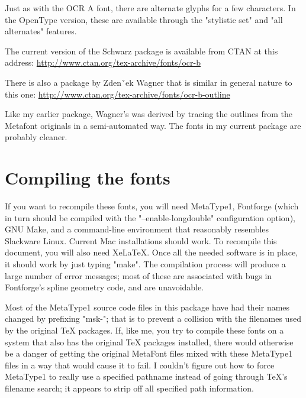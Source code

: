 \documentclass{article}
\begin{document}
Just as with the OCR A font, there are alternate glyphs for a
few characters.  In the OpenType version, these are available through the
"stylistic set" and "all alternates" features.

The current version of the Schwarz package is available from CTAN at this
address:  \url{http://www.ctan.org/tex-archive/fonts/ocr-b}

There is also a package by Zdenˇ\hspace{-0.1in}ek Wagner that is similar
in general nature to this one:
\url{http://www.ctan.org/tex-archive/fonts/ocr-b-outline}

Like my earlier package, Wagner's was derived by tracing the outlines from
the Metafont originals in a semi-automated way.  The fonts in my current
package are probably cleaner.

\section{Compiling the fonts}

If you want to recompile these fonts, you will need MetaType1, Fontforge
(which in turn should be compiled with the "--enable-longdouble"
configuration option), GNU Make, and a command-line environment that
reasonably resembles Slackware Linux.  Current Mac installations should
work.  To recompile this document, you will also need XeLaTeX\@.  Once all the
needed software is in place, it should work by just typing "make".  The
compilation process will produce a large number of error messages; most of
these are associated with bugs in Fontforge's spline geometry code, and are
unavoidable.

Most of the MetaType1 source code files in this package
have had their names changed by prefixing "msk-"; that is to prevent a
collision with the filenames used by the original TeX packages.  If, like
me, you try to compile these fonts on a system that also has the original
TeX packages installed, there would otherwise be a danger of getting the
original MetaFont files mixed with these MetaType1 files in a way that would
cause it to fail.  I couldn't figure out how to force MetaType1 to really
use a specified pathname instead of going through TeX's filename search; it
appears to strip off all specified path information.
\end{document}
